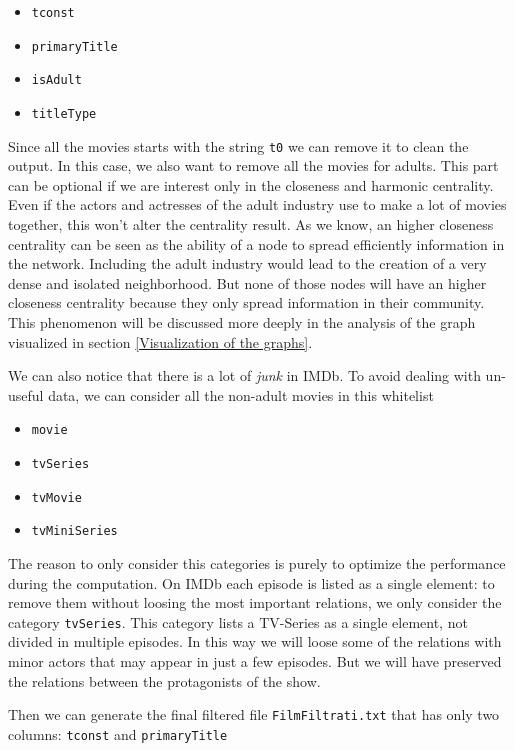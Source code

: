 \begin{itemize}
    \item \texttt{tconst}
    \item \texttt{primaryTitle}
    \item \texttt{isAdult}
    \item \texttt{titleType}
\end{itemize}
Since all the movies starts with the string \texttt{t0} we can remove it to clean the output. In this case, we also want to remove all the movies for adults. This part can be optional if we are interest only in the closeness and harmonic centrality. Even if the actors and actresses of the adult industry use to make a lot of movies together, this won't alter the centrality result. As we know, an higher closeness centrality can be seen as the ability of a node to spread efficiently information in the network. Including the adult industry would lead to the creation of a very dense and isolated neighborhood. But none of those nodes will have an higher closeness centrality because they only spread information in their community. This phenomenon will be discussed more deeply in the analysis of the graph visualized in section \ref{Visualization of the graphs}. \s

\noindent We can also notice that there is a lot of \emph{junk} in IMDb. To avoid dealing with un-useful data, we can consider all the non-adult movies in this whitelist

\begin{itemize}
    \item \texttt{movie}
    \item \texttt{tvSeries}
    \item \texttt{tvMovie}
    \item \texttt{tvMiniSeries}
\end{itemize}
The reason to only consider this categories is purely to optimize the performance during the computation. On IMDb each episode is listed as a single element: to remove them without loosing the most important relations, we only consider the category \texttt{tvSeries}. This category lists a TV-Series as a single element, not divided in multiple episodes. In this way we will loose some of the relations with minor actors that may appear in just a few episodes. But we will have preserved the relations between the protagonists of the show. \s

\noindent Then we can generate the final filtered file \texttt{FilmFiltrati.txt} that has only two columns: \texttt{tconst} and \texttt{primaryTitle}

